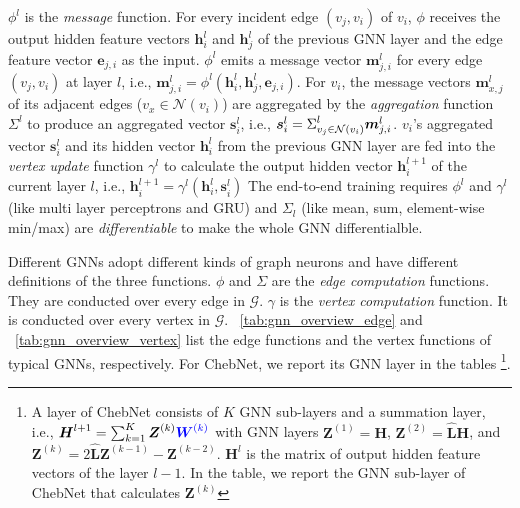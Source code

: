 $\phi^l$ is the \emph{message} function.
For every incident edge $(v_j, v_i)$ of $v_i$, $\phi$ receives the output hidden feature vectors $\boldsymbol{h}^l_i$ and $\boldsymbol{h}^l_j$ of the previous GNN layer and the edge feature vector $\boldsymbol{e}_{j,i}$ as the input.
$\phi^l$ emits a message vector $\boldsymbol{m}^l_{j,i}$ for every edge $(v_j, v_i)$ at layer $l$, i.e., $\boldsymbol{m}^l_{j,i}=\phi^l(\boldsymbol{h}^l_i, \boldsymbol{h}^l_j, \boldsymbol{e}_{j,i})$.
For $v_i$, the message vectors $\boldsymbol{m}^l_{x,j}$ of its adjacent edges ($v_x \in \mathcal{N}(v_i)$) are aggregated by the \emph{aggregation} function $\Sigma^l$ to produce an aggregated vector $\boldsymbol{s}^l_i$, i.e., $\boldsymbol{s}^l_i=\mathlarger{\Sigma}^l_{v_j \in \mathcal{N}(v_i)}\boldsymbol{m}^l_{j,i}$.
$v_i$'s aggregated vector $\boldsymbol{s}^l_i$ and its hidden vector $\boldsymbol{h}^l_i$ from the previous GNN layer are fed into the \emph{vertex update} function $\gamma^l$ to calculate the output hidden vector $\boldsymbol{h}^{l+1}_i$ of the current layer $l$, i.e., $\boldsymbol{h}^{l+1}_i = \gamma^l(\boldsymbol{h}^l_i, \boldsymbol{s}^l_i)$
The end-to-end training requires $\phi^l$ and $\gamma^l$ (like multi layer perceptrons and GRU) and $\Sigma_l$ (like mean, sum, element-wise min/max) are \emph{differentiable} to make the whole GNN differentialble.

Different GNNs adopt different kinds of graph neurons and have different definitions of the three functions.
$\phi$ and $\Sigma$ are the \emph{edge computation} functions.
They are conducted over every edge in $\mathcal{G}$.
$\gamma$ is the \emph{vertex computation} function.
It is conducted over every vertex in $\mathcal{G}$.
\tablename~\ref{tab:gnn_overview_edge} and \tablename~\ref{tab:gnn_overview_vertex} list the edge functions and the vertex functions of typical GNNs, respectively.
For ChebNet, we report its GNN layer in the tables \footnote{A layer of ChebNet consists of $K$ GNN sub-layers and a summation layer, i.e., $\boldsymbol{H}^{l+1} = \sum_{k=1}^K{\boldsymbol{Z}^{(k)} \textcolor{blue}{\boldsymbol{W}^{(k)}}}$ with GNN layers $\boldsymbol{Z}^{(1)}=\boldsymbol{H}$, $\boldsymbol{Z}^{(2)}=\hat{\boldsymbol{L}}\boldsymbol{H}$, and $\boldsymbol{Z}^{(k)}=2\hat{\boldsymbol{L}}\boldsymbol{Z}^{(k-1)} - \boldsymbol{Z}^{(k-2)}$. $\boldsymbol{H}^l$ is the matrix of output hidden feature vectors of the layer $l-1$. In the table, we report the GNN sub-layer of ChebNet that calculates $\boldsymbol{Z}^{(k)}$}.

